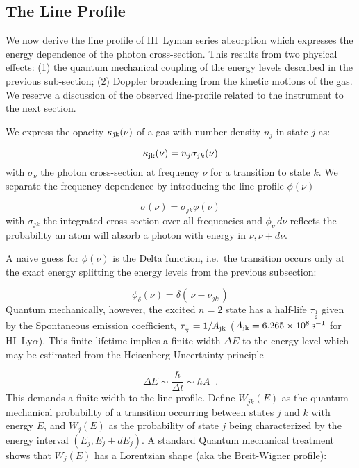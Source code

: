 \documentclass[graybox]{svmult}
\newcommand{\HI}{H{\sc I}}
\def\lya{Ly$\alpha$}
\def\ohf{\frac{1}{2}}
\def\ltp{\left ( \,}
\def\rtp{\, \right  ) }
\begin{document}
\subsection{The Line Profile}

We now derive the line profile of \HI\ Lyman series absorption
which expresses the energy dependence of the
photon cross-section.   This results from two physical
effects: 
(1) the quantum mechanical coupling of the energy
levels described in the previous sub-section; 
(2) Doppler broadening from the kinetic motions of the gas.
We reserve a discussion of the observed
line-profile related to the instrument to the next section.

We express the opacity $\kappa_{\rm jk}(\nu)$
of a gas with number
density $n_j$ in state $j$ as:

\begin{equation} 
\kappa_{\rm jk}(\nu) = n_j \sigma_{jk}(\nu)
\end{equation} 
with $\sigma_\nu$ the photon cross-section 
at frequency $\nu$ for a transition to state $k$.
We separate the frequency dependence by introducing
the line-profile $\phi(\nu)$

\begin{equation}
\sigma(\nu) = \sigma_{jk} \phi(\nu)
\end{equation}
with $\sigma_{jk}$ the integrated cross-section over all frequencies
and $\phi_\nu \, d\nu$ reflects the probability an atom will absorb
a photon with energy in $\nu, \nu + d\nu$.

A naive guess for $\phi(\nu)$ is the Delta function,
i.e.\ the transition occurs only at the exact energy
splitting the energy levels from the previous subsection:

\begin{equation}
\phi_\delta(\nu) = \delta \ltp \nu - \nu_{jk} \rtp
\end{equation}
Quantum mechanically, however, the excited $n=2$
state has a half-life $\tau_\ohf$ 
given by the Spontaneous emission coefficient,
$\tau_\ohf = 1/A_{\rm jk}$
($A_{\rm jk} = 6.265 \times 10^{8} \, \rm s^{-1}$
for \HI\ \lya).
This finite lifetime implies a finite width
$\Delta E$ to the energy level which may be estimated
from the Heisenberg Uncertainty principle

\begin{equation}
\Delta E \sim \frac{\hbar}{\Delta t} \sim \hbar A \;\; .
\end{equation}
This demands a finite width to the line-profile.
Define $W_{jk}(E)$ as the quantum mechanical
probability of a transition occurring 
between states $j$ and $k$ with energy $E$,
and $W_j(E)$ 
as the probability of state $j$ being characterized
by the energy interval $(E_j, E_j+dE_j)$.
A standard Quantum mechanical treatment shows that
$W_j(E)$ has a Lorentzian shape (aka the Breit-Wigner
profile): 
\end{document}
